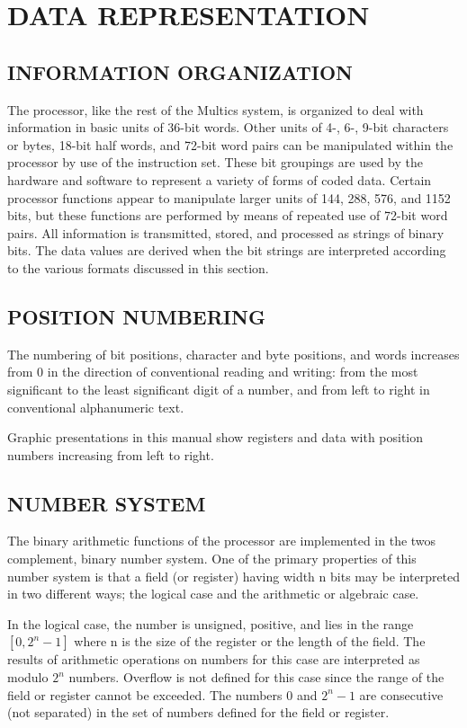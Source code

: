 \section{DATA REPRESENTATION}


\subsection{INFORMATION ORGANIZATION}


The processor, like the rest of the Multics system, is organized to deal with
information in basic units of 36-bit words. Other units of 4-, 6-, 9-bit
characters or bytes, 18-bit half words, and 72-bit word pairs can be
manipulated within the processor by use of the instruction set. These bit
groupings are used by the hardware and software to represent a variety of forms
of coded data.  Certain processor functions appear to manipulate larger units
of 144, 288, 576, and 1152 bits, but these functions are performed by means of
repeated use of 72-bit word pairs. All information is transmitted, stored, and
processed as strings of binary bits. The data values are derived when the bit
strings are interpreted according to the various formats discussed in this
section.  

\subsection{POSITION NUMBERING}

The numbering of bit positions, character and byte positions, and words
increases from 0 in the direction of conventional reading and writing: from the
most significant to the least significant digit of a number, and from left to
right in conventional alphanumeric text.

Graphic presentations in this manual show registers and data with position
numbers increasing from left to right.


\subsection{NUMBER SYSTEM}


The binary arithmetic functions of the processor are implemented in the twos
complement, binary number system. One of the primary properties of this number
system is that a field (or register) having width n bits may be interpreted in
two different ways; the logical case and the arithmetic or algebraic case.

In the logical case, the number is unsigned, positive, and lies in the range
$[0,2^n-1]$ where n is the size of the register or the length of the field. The
results of arithmetic operations on numbers for this case are interpreted as
modulo $2^n$ numbers. Overflow is not defined for this case since the range of
the
field or register cannot be exceeded. The numbers 0 and $2^n-1$ are consecutive
(not separated) in the set of numbers defined for the field or register.

